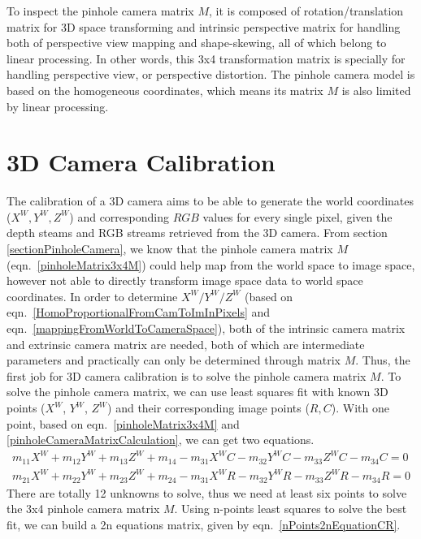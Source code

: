 To inspect the pinhole camera matrix \(M\), it is composed of rotation/translation matrix for 3D space transforming and intrinsic perspective matrix for handling both of perspective view mapping and shape-skewing, all of which belong to linear processing. In other words, this 3x4 transformation matrix is specially for handling perspective view, or perspective distortion. The pinhole camera model is based on the homogeneous coordinates, which means its matrix \(M\) is also limited by linear processing.
   
\section{3D Camera Calibration}
\label{section3DcameraCalibration}
\indent
The calibration of a 3D camera aims to be able to generate the world coordinates (\(X^W, Y^W, Z^W\)) and corresponding \(RGB\) values for every single pixel, given the depth steams and RGB streams retrieved from the 3D camera. From section \ref{sectionPinholeCamera}, we know that the pinhole camera matrix \(M\) (eqn.~\ref{pinholeMatrix3x4M}) could help map from the world space to image space, however not able to directly transform image space data to world space coordinates. In order to determine \(X^W/Y^W/Z^W\) (based on eqn.~\ref{HomoProportionalFromCamToImInPixels} and eqn.~\ref{mappingFromWorldToCameraSpace}), both of the intrinsic camera matrix and extrinsic camera matrix are needed, both of which are intermediate parameters and practically can only be determined through matrix \(M\). Thus, the first job for 3D camera calibration is to solve the pinhole camera matrix \(M\). To solve the pinhole camera matrix, we can use least squares fit with known 3D points (\(X^W\), \(Y^W\), \(Z^W\)) and their corresponding image points (\(R, C\)). With one point, based on eqn.~\ref{pinholeMatrix3x4M} and \ref{pinholeCameraMatrixCalculation}, we can get two equations.
\begin{equation}
\begin{aligned}
m_{11}X^W + m_{12}Y^W + m_{13}Z^W + m_{14} - m_{31}X^WC - m_{32}Y^WC - m_{33}Z^WC - m_{34}C = 0%
\\%
m_{21}X^W + m_{22}Y^W + m_{23}Z^W + m_{24} - m_{31}X^WR - m_{32}Y^WR - m_{33}Z^WR - m_{34}R = 0
\end{aligned}
\label{onePointEquationCR}
\end{equation}%
\noindent
There are totally 12 unknowns to solve, thus we need at least six points to solve the 3x4 pinhole camera matrix \(M\). Using n-points least squares to solve the best fit, we can build a 2n equations matrix, given by eqn.~\ref{nPoints2nEquationCR}.

